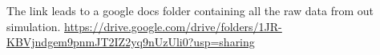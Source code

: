 The link leads to a google docs folder containing all the raw data from out simulation.
\url{https://drive.google.com/drive/folders/1JR-KBVjndgem9pnmJT2IZ2yq9nUzUli0?usp=sharing}
